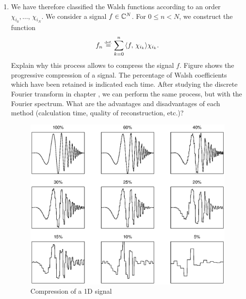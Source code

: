 \begin{exo}
\begin{enumerate}
\item We have therefore classified the Walsh functions according to an order $ \chi_{i_0}, \ldots, \, \chi_{i_N} $. We consider a signal $ f \in \mathbb{C}^N $. For $ 0 \leq n <N $, we construct the function
\begin{equation*}
f_n \stackrel{\mbox{\upshape\tiny def.}}{=} \sum_{k = 0}^{n}{\langle f,\,\chi_{i_k}\rangle \chi_{i_k}}.
\end{equation*}
Explain why this process allows to compress the signal $ f $. Figure  shows the progressive compression of a signal. The percentage of Walsh coefficients which have been retained is indicated each time. After studying the discrete Fourier transform in chapter , we can perform the same process, but with the Fourier spectrum. What are the advantages and disadvantages of each method (calculation time, quality of reconstruction, etc.)? \begin{figure}[ht]
    \begin{center}
    \includegraphics [scale = 0.6]{images/compression-walsh-1d.eps}
    \end{center}
    \caption{Compression of a 1D signal}
              \label{fig-compression-walsh-1d}
\end{figure}
 

\end{enumerate}
\end{exo}
